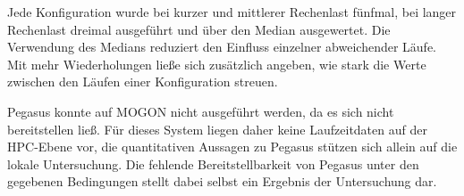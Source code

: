 Jede Konfiguration wurde bei kurzer und mittlerer Rechenlast
fünfmal, bei langer Rechenlast dreimal ausgeführt und über den
Median ausgewertet. Die Verwendung des Medians reduziert den
Einfluss einzelner abweichender Läufe. Mit mehr Wiederholungen
ließe sich zusätzlich angeben, wie stark die Werte zwischen den
Läufen einer Konfiguration streuen.

Pegasus konnte auf MOGON nicht ausgeführt werden, da es sich
nicht bereitstellen ließ. Für dieses System liegen daher keine
Laufzeitdaten auf der HPC-Ebene vor, die quantitativen Aussagen zu
Pegasus stützen sich allein auf die lokale Untersuchung. Die
fehlende Bereitstellbarkeit von Pegasus unter den gegebenen
Bedingungen stellt dabei selbst ein Ergebnis der Untersuchung dar.